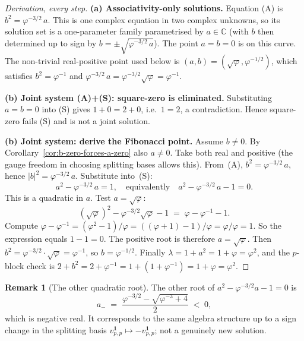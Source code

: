 \documentclass[11pt,a4paper]{article}
\theoremstyle{definition}
\newtheorem{remark}[definition]{Remark}
\newcommand{\one}{\mathbf{1}}
\begin{document}
\begin{proof}[Derivation, every step]
\textbf{(a) Associativity-only solutions.} Equation (A) is
$b^{2} = \varphi^{-3/2}\,a$. This is one complex equation in two
complex unknowns, so its solution set is a one-parameter family
parametrised by $a\in\mathbb{C}$ (with $b$ then determined up to sign by
$b = \pm\sqrt{\varphi^{-3/2}\,a}$). The point $a=b=0$ is on this curve.
The non-trivial real-positive point used below is
$(a,b)=(\sqrt\varphi,\varphi^{-1/2})$, which satisfies
$b^{2} = \varphi^{-1}$ and $\varphi^{-3/2}\,a = \varphi^{-3/2}\sqrt\varphi
= \varphi^{-1}$. \checkmark

\textbf{(b) Joint system (A)+(S): square-zero is eliminated.} Substituting
$a=b=0$ into (S) gives $1+0 = 2+0$, i.e.\ $1=2$, a contradiction. Hence
square-zero fails (S) and is not a joint solution.

\textbf{(b) Joint system: derive the Fibonacci point.}
Assume $b \neq 0$. By Corollary~\ref{cor:b-zero-forces-a-zero} also
$a \neq 0$. Take both real and positive (the gauge freedom in choosing
splitting bases allows this). From~(A),
$b^{2} = \varphi^{-3/2}\,a$, hence $|b|^{2} = \varphi^{-3/2}\,a$.
Substitute into~(S):
\[
a^{2} - \varphi^{-3/2}\,a = 1,
\quad\text{equivalently}\quad
a^{2} - \varphi^{-3/2}\,a - 1 = 0.
\]
This is a quadratic in $a$. Test $a = \sqrt{\varphi}$:
\[
(\sqrt\varphi)^{2} - \varphi^{-3/2}\sqrt\varphi - 1
\;=\; \varphi - \varphi^{-1} - 1.
\]
Compute $\varphi - \varphi^{-1} = (\varphi^{2} - 1)/\varphi
= ((\varphi+1)-1)/\varphi = \varphi/\varphi = 1$. So the expression equals
$1 - 1 = 0$. \checkmark
The positive root is therefore $a = \sqrt\varphi$.
Then $b^{2} = \varphi^{-3/2}\cdot\sqrt\varphi = \varphi^{-1}$, so
$b = \varphi^{-1/2}$.
Finally $\lambda = 1 + a^{2} = 1 + \varphi = \varphi^{2}$, and the
$p$-block check is $2 + b^{2} = 2 + \varphi^{-1} = 1 + (1+\varphi^{-1})
= 1 + \varphi = \varphi^{2}$. \checkmark
\end{proof}

\begin{remark}[The other quadratic root]
The other root of $a^{2} - \varphi^{-3/2}a - 1 = 0$ is
\[
a_- \;=\; \frac{\varphi^{-3/2} - \sqrt{\varphi^{-3} + 4}}{2} \;<\; 0,
\]
which is negative real. It corresponds to the same algebra structure up to
a sign change in the splitting basis $v^{\one}_{p,p}\mapsto -v^{\one}_{p,p}$;
not a genuinely new solution.
\end{remark}
\end{document}
